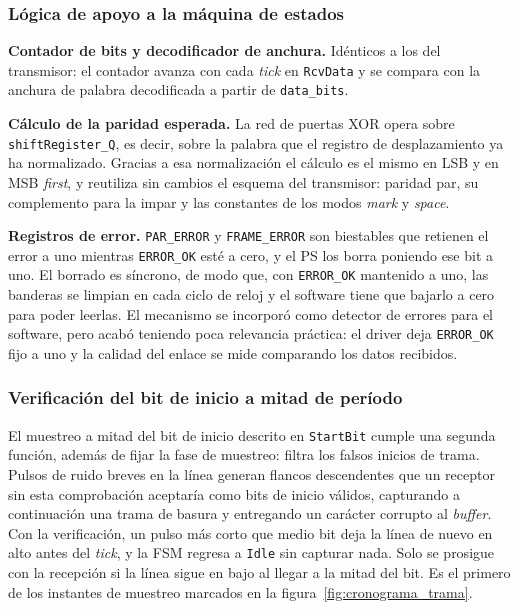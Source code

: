 \subsubsection{Lógica de apoyo a la máquina de estados}

\textbf{Contador de bits y decodificador de anchura.} Idénticos a los del transmisor: el contador
avanza con cada \textit{tick} en \texttt{RcvData} y se compara con la anchura de palabra
decodificada a partir de \texttt{data\_bits}.

\textbf{Cálculo de la paridad esperada.} La red de puertas XOR opera sobre
\texttt{shiftRegister\_\allowbreak Q}, es decir, sobre la palabra que el registro de desplazamiento ya ha
normalizado. Gracias a esa normalización el cálculo es el mismo en LSB y en MSB \textit{first}, y
reutiliza sin cambios el esquema del transmisor: paridad par, su complemento para la impar y las
constantes de los modos \textit{mark} y \textit{space}.

\textbf{Registros de error.} \texttt{PAR\_ERROR} y \texttt{FRAME\_ERROR} son biestables que
retienen el error a uno mientras \texttt{ERROR\_OK} esté a cero, y el PS los borra poniendo ese bit
a uno. El borrado es síncrono, de modo que, con \texttt{ERROR\_OK} mantenido a uno, las banderas se
limpian en cada ciclo de reloj y el software tiene que bajarlo a cero para poder leerlas. El
mecanismo se incorporó como detector de errores para el software, pero acabó teniendo poca
relevancia práctica: el driver deja \texttt{ERROR\_OK} fijo a uno y la calidad del enlace se mide
comparando los datos recibidos.

\subsubsection{Verificación del bit de inicio a mitad de período}
\label{sec:startbit_robustez}

El muestreo a mitad del bit de inicio descrito en \texttt{StartBit} cumple una segunda función,
además de fijar la fase de muestreo: filtra los falsos inicios de trama. Pulsos de ruido breves en
la línea generan flancos descendentes que un receptor sin esta comprobación aceptaría como bits de
inicio válidos, capturando a continuación una trama de basura y entregando un carácter corrupto al
\textit{buffer}. Con la verificación, un pulso más corto que medio bit deja la línea de nuevo en
alto antes del \textit{tick}, y la FSM regresa a \texttt{Idle} sin capturar nada. Solo se prosigue
con la recepción si la línea sigue en bajo al llegar a la mitad del bit. Es el primero de los
instantes de muestreo marcados en la figura~\ref{fig:cronograma_trama}.

